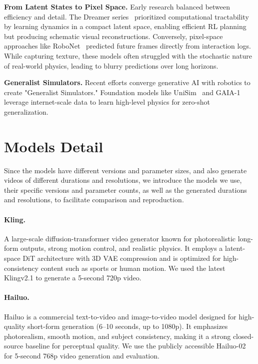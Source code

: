 \textbf{From Latent States to Pixel Space.} 
Early research balanced between efficiency and detail. The Dreamer series~\citep{hafner2023mastering} prioritized computational tractability by learning dynamics in a compact latent space, enabling efficient RL planning but producing schematic visual reconstructions. Conversely, pixel-space approaches like RoboNet~\citep{dasari2019robonet} predicted future frames directly from interaction logs. While capturing texture, these models often struggled with the stochastic nature of real-world physics, leading to blurry predictions over long horizons.

\textbf{Generalist Simulators.} 
Recent efforts converge generative AI with robotics to create "Generalist Simulators." Foundation models like UniSim~\citep{yang2023unisim} and GAIA-1~\citep{hu2023gaia} leverage internet-scale data to learn high-level physics for zero-shot generalization. 


\section{Models Detail}
Since the models have different versions and parameter sizes, and also generate videos of different durations and resolutions, we introduce the models we use, their specific versions and parameter counts, as well as the generated durations and resolutions, to facilitate comparison and reproduction.
\paragraph{Kling.~\cite{Kling}}
A large-scale diffusion-transformer video generator known for photorealistic long-form outputs, strong motion control, and realistic physics. It employs a latent-space DiT architecture with 3D VAE compression and is optimized for high-consistency content such as sports or human motion. We used the latest Klingv2.1 to generate a 5-second 720p video.

\paragraph{Hailuo.~\cite{Hailuo}}
Hailuo is a commercial text-to-video and image-to-video model designed for high-quality short-form generation (6–10 seconds, up to 1080p). It emphasizes photorealism, smooth motion, and subject consistency, making it a strong closed-source baseline for perceptual quality. We use the publicly accessible Hailuo-02 for 5-second 768p video generation and evaluation.

